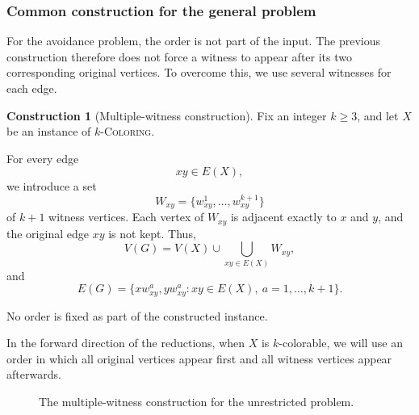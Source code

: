 \documentclass[12pt]{article}
\theoremstyle{plain}
\theoremstyle{definition}
\theoremstyle{remark}
\theoremstyle{definition}
\newtheorem{construction}[theorem]{Construction}
\begin{document}
\subsubsection{Common construction for the general problem}
\label{subsubsec:for-common-general}

For the avoidance problem, the order is not part of the
input. The previous construction therefore does not force a witness to
appear after its two corresponding original vertices. To overcome this,
we use several witnesses for each edge.

\begin{construction}[Multiple-witness construction]
\label{constr:for-general}
Fix an integer \(k\ge 3\), and let \(X\) be an instance of
\(k\)-\textsc{Coloring}.

For every edge
\[
xy\in E(X),
\]
we introduce a set
\[
W_{xy}
=
\{w^1_{xy},\dots,w^{k+1}_{xy}\}
\]
of \(k+1\) witness vertices. Each vertex of \(W_{xy}\) is adjacent
exactly to \(x\) and \(y\), and the original edge \(xy\) is not kept.
Thus,
\[
V(G)
=
V(X)\cup
\bigcup_{xy\in E(X)}W_{xy},
\]
and
\[
E(G)
=
\{xw^a_{xy},yw^a_{xy}:
xy\in E(X),\
a=1,\dots,k+1\}.
\]

No order is fixed as part of the constructed instance.

In the forward direction of the reductions, when \(X\) is
\(k\)-colorable, we will use an order in which all original vertices
appear first and all witness vertices appear afterwards.
\end{construction}

\begin{figure}[ht]
\centering
{}
\caption{The multiple-witness construction for the unrestricted problem.}
\label{fig:for-unrestricted-construction}
\end{figure}
\end{document}
